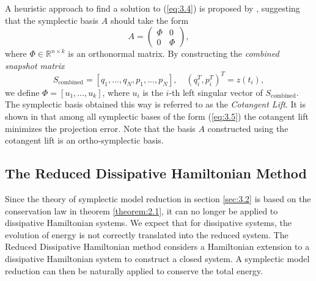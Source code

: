 A heuristic approach to find a solution to (\ref{eq:3.4}) is proposed by \cite{Peng:2014di}, suggesting that the symplectic basis $A$ should take the form
\begin{equation} \label{eq:3.5}
	A = 
	\begin{pmatrix}
		\Phi & 0 \\
		0 & \Phi
	\end{pmatrix},
\end{equation}
where $\Phi \in \mathbb{R}^{n\times k}$ is an orthonormal matrix. By constructing the \emph{combined snapshot matrix}
\begin{equation} \label{eq:3.6}
	S_{\text{combined}} = [q_1,\dots,q_N,p_1,\dots,p_N], \quad (q_i^T,p_i^T)^T = z(t_i),
\end{equation}
we define $\Phi=[u_1,\dots,u_k]$, where $u_i$ is the $i$-th left singular vector of $S_{\text{combined}}$. The symplectic basis obtained this way is referred to as the \emph{Cotangent Lift}. It is shown in \cite{Peng:2014di} that among all symplectic bases of the form (\ref{eq:3.5}) the cotangent lift minimizes the projection error. Note that the basis $A$ constructed using the cotangent lift is an ortho-symplectic basis.

\subsection{The Reduced Dissipative Hamiltonian Method} \label{sec:3.3}

Since the theory of symplectic model reduction in section \ref{sec:3.2} is based on the conservation law in theorem \ref{theorem:2.1}, it can no longer be applied to dissipative Hamiltonian systems. We expect that for dissipative systems, the evolution of energy is not correctly translated into the reduced system. The Reduced Dissipative Hamiltonian method considers a Hamiltonian extension to a dissipative Hamiltonian system to construct a closed system. A symplectic model reduction can then be naturally applied to conserve the total energy.

